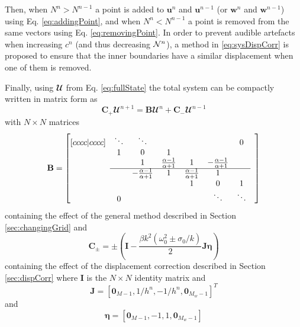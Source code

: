 Then, when $ N^n > N^{n-1}$ a point is added to $\mathbf{u}^n$ and $\mathbf{u}^{n-1}$ (or $\mathbf{w}^n$ and $\mathbf{w}^{n-1}$) using Eq. \eqref{eq:addingPoint}, and when $ N^n  < N^{n-1}$ a point is removed from the same vectors using Eq. \eqref{eq:removingPoint}. In order to prevent audible artefacts when increasing $c^n$ (and thus decreasing $\mathcal{N}^n$), a method in \eqref{eq:sysDispCorr} is proposed to ensure that the inner boundaries have a similar displacement when one of them is removed. 

Finally, using $\mathbfcal{U}$ from Eq. \eqref{eq:fullState} the total system can be compactly written in matrix form as
\begin{equation}\label{eq:totalSystem}
    \mathbf{C}_+\mathbfcal{U}^{n+1} = 
    \mathbf{B}
    \mathbfcal{U}^n
    + \mathbf{C}_-\mathbfcal{U}^{n-1}
\end{equation}
with $ N \times N$ matrices
\begin{equation}\label{eq:bMat}
    \mathbf{B} = 
    \begin{bmatrix}[cccc|cccc]
        & \ddots  &\ddots & & & & 0 & \\
          & 1 & 0 & 1 & & & & \\
         & & 1 & \frac{\alpha - 1}{\alpha + 1} & 1  & -\frac{\alpha - 1}{\alpha + 1} & \\ \cline{2-7}
         & & -\frac{\alpha - 1}{\alpha + 1} & 1  & \frac{\alpha - 1}{\alpha + 1}  & 1 & & \\
            & & & &1 & 0 & 1  \\
            & 0 & &  &  &\ddots & \ddots &
       \end{bmatrix}
\end{equation}
containing the effect of the general method described in Section \ref{sec:changingGrid} and
\begin{equation}\label{eq:CMat}
    \mathbf{C}_\pm = \pm\left(\mathbf{I} - \frac{\beta k^2 (\omega_0^2\pm\sigma_0/k)}{2}\mathbf{J}\boldsymbol{\eta}\right)
\end{equation}
containing the effect of the displacement correction described in Section \ref{sec:dispCorr} where $\mathbf{I}$ is the $ N \times N$ identity matrix and 
\begin{equation}
    \mathbf{J} = [\mathbf{0}_{M-1}, 1/h^n, -1/h^n, \mathbf{0}_{M_w-1}]^T
\end{equation}
and 
\begin{equation}
    \boldsymbol{\eta} = [\mathbf{0}_{M-1}, -1, 1, \mathbf{0}_{M_w-1}]
\end{equation}
